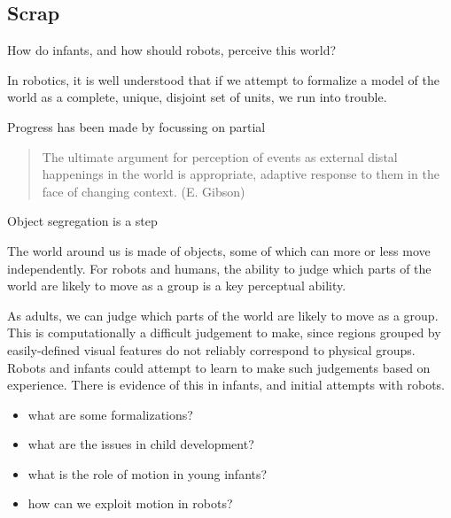 \cite{gibson88exploratory}

\cite{spelke90principles}


\subsection{Scrap}


How do infants, and
how should robots, perceive this world?  

In robotics, it is well understood that if we attempt to formalize a
model of the world as a complete, unique, disjoint set of units, we
run into trouble. 

 Progress has been made by focussing on 
partial


\begin{quote}

The ultimate argument for perception of events as external distal
happenings in the world is appropriate, adaptive response to them
in the face of changing context. (E. Gibson)

\end{quote}


Object segregation is a step


The world around us is made of objects, some of which can more or less
move independently. For robots and humans, the ability to judge which
parts of the world are likely to move as a group is a key perceptual
ability.


As adults, we can judge which parts of the world
are likely to move as a group. This is computationally a difficult
judgement to make, since regions grouped by easily-defined visual
features do not reliably correspond to physical groups. Robots and
infants could attempt to learn to make such judgements based on
experience. There is evidence of this in infants, and initial attempts
with robots.



\begin{itemize}

\item what are some formalizations?

\item what are the issues in child development?

\item what is the role of motion in young infants?

\item how can we exploit motion in robots?

\end{itemize}



